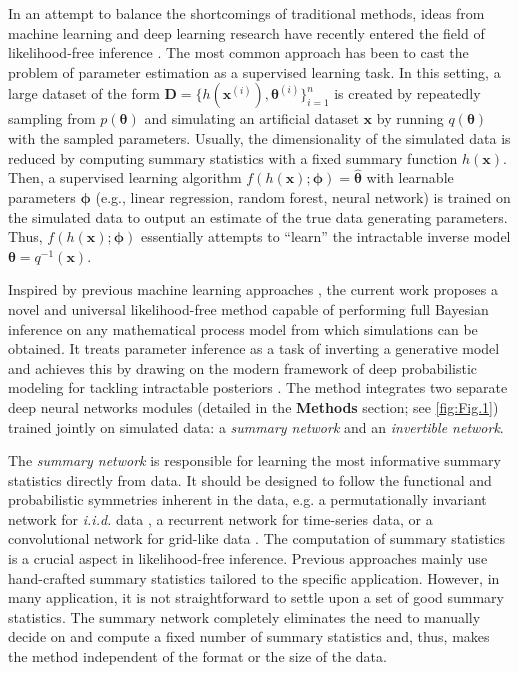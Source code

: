 \documentclass[9pt,twoside,lineno]{pnas-new}
\begin{document}
In an attempt to balance the shortcomings of traditional methods, ideas from machine learning and deep learning research have recently entered the field of likelihood-free inference \cite{radev2019towards, hwang2018conditional, mestdagh2018prepaid, raynal2018abc, jiang2017learning, lueckmann2017flexible, papamakarios2016fast}. The most common approach has been to cast the problem of parameter estimation as a supervised learning task. In this setting, a large dataset of the form $\boldsymbol{D} = \{h(\boldsymbol{x}^{(i)}), \boldsymbol{\theta}^{(i)}\}_{i=1}^{n}$ is created by repeatedly sampling from $p(\boldsymbol{\theta})$ and simulating an artificial dataset $\boldsymbol{x}$ by running $q(\boldsymbol{\theta})$ with the sampled parameters. Usually, the dimensionality of the simulated data is reduced by computing summary statistics  with a fixed summary function $h(\boldsymbol{x})$. Then, a supervised learning algorithm $f(h(\boldsymbol{x});\boldsymbol{\phi}) = \widehat{\boldsymbol{\theta}}$ with learnable parameters $\boldsymbol{\phi}$ (e.g., linear regression, random forest, neural network) is trained on the simulated data to output an estimate of the true data generating parameters. Thus, $f(h(\boldsymbol{x});\boldsymbol{\phi})$ essentially attempts to “learn” the intractable inverse model $\boldsymbol{\theta} = q^{-1}(\boldsymbol{x})$.

Inspired by previous machine learning approaches \cite{hwang2018conditional, mestdagh2018prepaid, raynal2018abc, jiang2017learning, lueckmann2017flexible, papamakarios2016fast}, the current work proposes a novel and universal likelihood-free method capable of performing full Bayesian inference on any mathematical process model from which simulations can be obtained. It treats parameter inference as a task of inverting a generative model and achieves this by drawing on the modern framework of deep probabilistic modeling for tackling intractable posteriors \cite{ardizzone2018analyzing, kingma2018glow, grover2018flow, dinh2016density}. The method integrates two separate deep neural networks modules (detailed in the \textbf{Methods} section; see \autoref{fig:Fig.1}) trained jointly on simulated data: a \textit{summary network} and an \textit{invertible network}. 

The \textit{summary network} is responsible for learning the most informative summary statistics directly from data. It should be designed to follow the functional and probabilistic symmetries inherent in the data, e.g. a permutationally invariant network for \textit{i.i.d.} data \cite{bloem2019probabilistic}, a recurrent network for time-series data, or a convolutional network for grid-like data \cite{goodfellow2016deep}. The computation of summary statistics is a crucial aspect in likelihood-free inference. Previous approaches mainly use hand-crafted summary statistics tailored to the specific application. However, in many application, it is not straightforward to settle upon a set of good summary statistics. The summary network completely eliminates the need to manually decide on and compute a fixed number of summary statistics and, thus, makes the method independent of the format or the size of the data.
\end{document}
